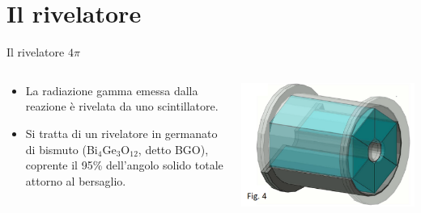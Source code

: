 \documentclass [xcolor=svgnames] {beamer}
\begin{document}
	\section{Il rivelatore}
	\begin{frame}{Il rivelatore $4\pi$}
		\begin{columns}
			\begin{column}{0.45\textwidth}
				\begin{itemize}
					\item La radiazione gamma emessa dalla reazione è rivelata da uno scintillatore.
					\item Si tratta di un rivelatore in germanato di bismuto (Bi$_{4}$Ge$_{3}$O$_{12}$, detto BGO), coprente il 95\% dell'angolo solido totale attorno al bersaglio.
				\end{itemize}
			\end{column}
			\begin{column}{0.45\textwidth}
				\centering
				\includegraphics[width=\textwidth]{img/bgo_3d.png}
			\end{column}
		\end{columns}
		
	\end{frame}
\end{document}
